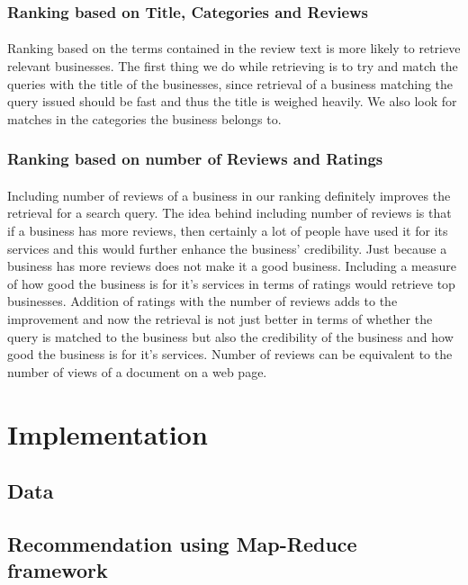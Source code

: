 \documentclass{article} %
\begin{document}
\subsubsection{Ranking based on Title, Categories and Reviews}
\paragraph{}Ranking based on the terms contained in the review text is more likely to retrieve relevant businesses. The first thing we do while retrieving is to try and match the queries with the title of the businesses, since retrieval of a business matching the query issued should be fast and thus the title is weighed heavily. We also look for matches in the categories the business belongs to. 
\subsubsection{Ranking based on number of Reviews and Ratings}
\paragraph{}Including number of reviews of a business in our ranking definitely improves the retrieval for a search query. The idea behind including number of reviews is that if a business has more reviews, then certainly a lot of people have used it for its services and this would further enhance the business' credibility. Just because a business has more reviews does not make it a good business. Including a measure of how good the business is for it's services in terms of ratings would retrieve top businesses. Addition of ratings with the number of reviews adds to the improvement and now the retrieval is not just better in terms of whether the query is matched to the business but also the credibility of the business and how good the business is for it's services. Number of reviews can be equivalent to the number of views of a document on a web page.    
\section{Implementation}
\subsection{Data}




\subsection{Recommendation using Map-Reduce framework}
\end{document}
